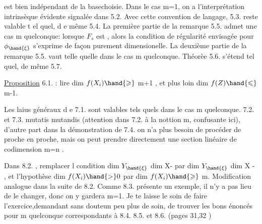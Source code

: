 
est bien indépendant de la base\hand{/}choisie.  Dans le cas  m=1, on a
l'interprétation intrinsèque évidente signalée dans 5.2.  Avec cette
convention de langage, 5.3.  reste valable t el quel, d e même 5.4.
La première partie de la remarque 5.5.   admet une  
 cas m quelconque:  lorsque $F_s$  est  , alors la condition de
régularité envisagée pour $\phi_{\hand{\xi}}$  s'exprime de façon purement dimensionelle.
La deuxième partie de la remarque 5.5. vaut telle quelle dans le cas
m quelconque.      Théorèe 5.6.  s'étend tel quel,  de même 5.7.

\uline{Proposition} 6.1.  :  lire   dim $f(X_i) \hand{\geqslant}$  m+1 ,  et
plus loin   dim $f(Z) \hand{\leqslant}$ m-1.

Les laius généraux d e 7.1. sont valables tels quels dans le cas
m quelconque.  7.2. et 7.3.  mutatis mutandis (attention dans 7.2.
à la nottion m, confusante ici),  d'autre part dans la démonstration
de 7.4. on n'a plus besoin de procéder de proche en proche, mais on
peut prendre directement une section linéaire  de codimension m=n .

Dans 8.2. , remplacer l condition    dim $Y_{\hand{\xi}}$ \hand{$>$} dim X-
par  dim $Y_{\hand{\xi}}$ \hand{$>$}  dim X  -  , et l'hypothèse  dim $f(X_i) \hand{>} 0$  par
dim $f(X_i) \hand{\geqslant}$ m.   Modification analogue dans la suite de 8.2.  Comme
8.3.  présente un exemple, il n'y a pas lieu de le changer, donc on
y gardera m=1.   Je te laisse le soin de faire l'exercice,demandant
sans doute\hand{/}un peu plus de soin, de trouver  les bons énoncés pour m
quelconque correspondants à  8.4.  8.5.  et 8.6.   (pages 31,32 )\hand{;}

